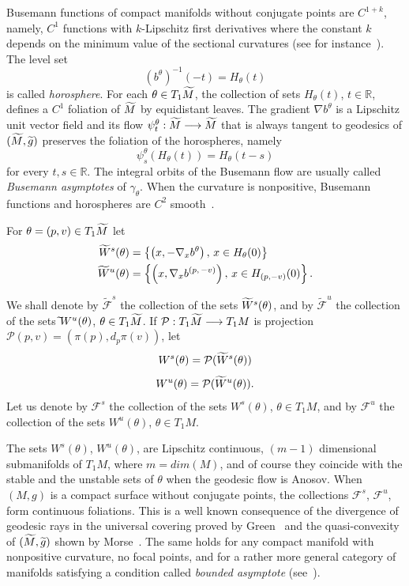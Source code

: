 \documentclass[AHL,Unicode,longabstracts,published]{cedram}
\newcommand{\bbR}{\mathbb{R}}
\newcommand{\clF}{\mathcal{F}}
\newcommand{\clP}{\mathcal{P}}
\let\oldtilde\tilde
\renewcommand*{\tilde}[1]{\mathchoice{\widetilde{#1}}{\widetilde{#1}}{\oldtilde{#1}}{\oldtilde{#1}}}
\begin{document}
Busemann functions of compact manifolds without conjugate points are $C^{1+k}$, namely, $C^{1}$ functions with $k$-Lipschitz first derivatives where the constant $k$ depends on the minimum value of the sectional curvatures (see for instance~\cite[Section~6]{kn:Pesin}). The level set
\[
(b^{\theta})^{-1}(-t)= H_{\theta}(t)
\]
is called \emph{horosphere}. For each $\theta \in T_{1}\tilde{M}$, the collection of sets $H_{\theta}(t)$, $t \in \bbR$, defines a $C^{1}$ foliation of $\tilde{M}$ by equidistant leaves. The gradient $\nabla b^{\theta}$ is a Lipschitz unit vector field and its flow $\psi^{\theta}_{t}: \tilde{M} \longrightarrow \tilde{M}$ that is always tangent to geodesics of $(\tilde{M}, \tilde{g})$ preserves the foliation of the horospheres, namely
\[
\psi^{\theta}_{s}(H_{\theta}(t)) = H_{\theta}(t-s)
\]
for every $t, s \in \bbR$. The integral orbits of the Busemann flow are usually called \emph{Busemann asymptotes} of $\gamma_{\theta}$. When the curvature is nonpositive, Busemann functions and horospheres are $C^{2}$ smooth~\cite{kn:Eschenburg}.

\begin{defi}\label{centerstable}
For $\theta = (p,v) \in T_{1}\tilde{M}$ let
\begin{align*}
\tilde{W}^{s}(\theta) &= \left\{\left(x, -\nabla_{x}b^{\theta}\right), \, x \in H_{\theta}(0) \right\}
\\
\tilde{W}^{u}(\theta) &= \left\{\left(x, \nabla_{x}b^{(p,\,-v)}\right), \, x \in H_{(p,-v)}(0)\right\}.
\end{align*}

We shall denote by $\widetilde{\clF}^{s}$ the collection of the sets $\tilde{W}^{s}(\theta)$, and by $\widetilde{\clF}^{u}$ the collection of the sets $\tilde{}W^{u}(\theta)$, $\theta \in T_{1}\tilde{M}$. If $\clP : T_{1}\tilde{M} \longrightarrow T_{1}M$ is projection $\clP(p,v) = (\pi(p), d_{p}\pi(v))$, let
\[
W^{s}(\theta) = \clP(\tilde{W}^{s}(\theta))
\]
\[
W^{u}(\theta) = \clP(\tilde{W}^{u}(\theta)).
\]
Let us denote by $\clF^{s}$ the collection of the sets $W^{s}(\theta)$, $\theta \in T_{1}M$, and by $\clF^{u}$ the collection of the sets $W^{u}(\theta)$, $\theta \in T_{1}M$.
\end{defi}

The sets $W^{s}(\theta)$, $W^{u}(\theta)$, are Lipschitz continuous, $(m-1)$ dimensional submanifolds of $T_{1}M$, where $m= dim(M)$, and of course they coincide with the stable and the unstable sets of $\theta$ when the geodesic flow is Anosov. When $(M,g)$ is a compact surface without conjugate points, the collections $\clF^{s}$, $\clF^{u}$, form continuous foliations. This is a well known consequence of the divergence of geodesic rays in the universal covering proved by Green~\cite{kn:Green} and the quasi-convexity of $(\tilde{M}, \tilde{g})$ shown by Morse~\cite{kn:Morse}. The same holds for any compact manifold with nonpositive curvature, no focal points, and for a rather more general category of manifolds satisfying a condition called \emph{bounded asymptote} (see~\cite{kn:Eschenburg}).
\end{document}
